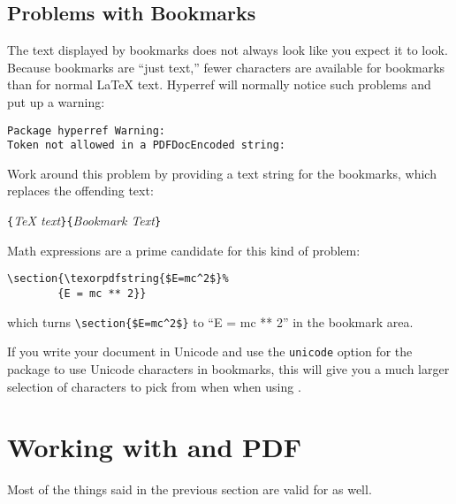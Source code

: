 \subsection{Problems with Bookmarks}

The text displayed by bookmarks does not always look like you expect
it to look. Because bookmarks are ``just text,'' fewer
characters are available for bookmarks than for normal \LaTeX{} text.
Hyperref will normally notice such problems and put up a warning:
\begin{code}
\begin{verbatim}
Package hyperref Warning:
Token not allowed in a PDFDocEncoded string:
\end{verbatim}
\end{code}
Work around this problem by providing a text string for
the bookmarks, which replaces the offending text:
\begin{lscommand}
\verb|{|\emph{\TeX{} text}\verb|}{|\emph{Bookmark Text}\verb|}|
\end{lscommand}


Math expressions are a prime candidate for this kind of problem:
\begin{code}
\begin{verbatim}
\section{\texorpdfstring{$E=mc^2$}%
        {E = mc ** 2}}
\end{verbatim}
\end{code}
which turns \verb+\section{$E=mc^2$}+ to ``E = mc ** 2'' in the bookmark area.

If you write your document in Unicode and use the \verb+unicode+ option for
the  package to use Unicode characters in bookmarks, this
will give you a much larger selection of characters to pick from when
when using .

\section{Working with  and PDF}
\label{sec:xetex}

%
Most of the things said in the previous section are valid for  as well.

